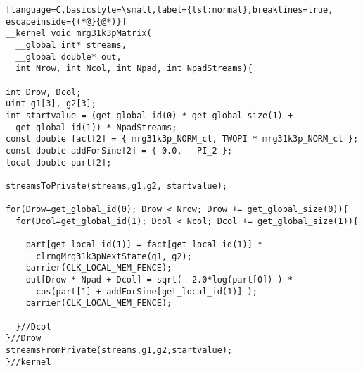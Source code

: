 \documentclass[article,nojss]{jss}\usepackage[]{graphicx}\usepackage[]{color}
\begin{document}
\begin{lstlisting}[language=C,basicstyle=\small,label={lst:normal},breaklines=true, escapeinside={(*@}{@*)}]
__kernel void mrg31k3pMatrix(
  __global int* streams,
  __global double* out,
  int Nrow, int Ncol, int Npad, int NpadStreams){

int Drow, Dcol;
uint g1[3], g2[3];
int startvalue = (get_global_id(0) * get_global_size(1) + 
  get_global_id(1)) * NpadStreams;
const double fact[2] = { mrg31k3p_NORM_cl, TWOPI * mrg31k3p_NORM_cl };
const double addForSine[2] = { 0.0, - PI_2 };
local double part[2];

streamsToPrivate(streams,g1,g2, startvalue);

for(Drow=get_global_id(0); Drow < Nrow; Drow += get_global_size(0)){
  for(Dcol=get_global_id(1); Dcol < Ncol; Dcol += get_global_size(1)){
        
    part[get_local_id(1)] = fact[get_local_id(1)] * 
      clrngMrg31k3pNextState(g1, g2);
    barrier(CLK_LOCAL_MEM_FENCE);
    out[Drow * Npad + Dcol] = sqrt( -2.0*log(part[0]) ) * 
      cos(part[1] + addForSine[get_local_id(1)] );
    barrier(CLK_LOCAL_MEM_FENCE);
    
  }//Dcol
}//Drow
streamsFromPrivate(streams,g1,g2,startvalue);
}//kernel
\end{lstlisting}

\end{document}
